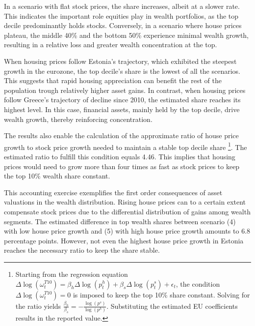 \documentclass[
  a4paper,
  DIV=11,
  numbers=noendperiod]{scrartcl}
\begin{document}
In a scenario with flat stock prices, the share increases, albeit at a
slower rate. This indicates the important role equities play in wealth
portfolios, as the top decile predominantly holds stocks. Conversely, in
a scenario where house prices plateau, the middle 40\% and the bottom
50\% experience minimal wealth growth, resulting in a relative loss and
greater wealth concentration at the top.

When housing prices follow Estonia's trajectory, which exhibited the
steepest growth in the eurozone, the top decile's share is the lowest of
all the scenarios. This suggests that rapid housing appreciation can
benefit the rest of the population trough relatively higher asset gains.
In contrast, when housing prices follow Greece's trajectory of decline
since 2010, the estimated share reaches its highest level. In this case,
financial assets, mainly held by the top decile, drive wealth growth,
thereby reinforcing concentration.

The results also enable the calculation of the approximate ratio of
house price growth to stock price growth needed to maintain a stable top
decile share \footnote{Starting from the regression equation
  \(\Delta \log(\omega_{t}^{T10}) = \beta_h \Delta \log(p^h_t) + \beta_s \Delta \log({p^s_t}) + \epsilon_t\),
  the condition \(\Delta \log(\omega_{t}^{T10}) = 0\) is imposed to keep
  the top 10\% share constant. Solving for the ratio yields
  \(\frac{\beta_h}{\beta_s}  = - \frac{\log({p^s})}{\log({p^h})}\).
  Substituting the estimated EU coefficients results in the reported
  value.}. The estimated ratio to fulfill this condition equals 4.46.
This implies that housing prices would need to grow more than four times
as fast as stock prices to keep the top 10\% wealth share constant.

This accounting exercise exemplifies the first order consequences of
asset valuations in the wealth distribution. Rising house prices can to
a certain extent compensate stock prices due to the differential
distribution of gains among wealth segments. The estimated difference in
top wealth shares between scenario (4) with low house price growth and
(5) with high house price growth amounts to 6.8 percentage points.
However, not even the highest house price growth in Estonia reaches the
necessary ratio to keep the share stable.
\end{document}
